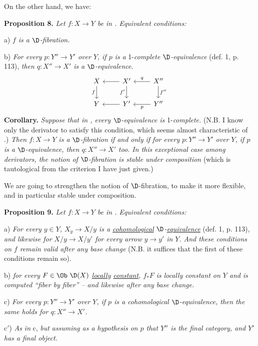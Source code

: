 On the other hand, we have:

\textbf{Proposition 8.} \textit{Let $f : X \to Y$ be in \Dia. Equivalent conditions:}

a) \textit{$f$ is a $\D$-fibration.}

b) \textit{For every $p : Y'' \to Y'$ over $Y$, if $p$ is a} 1-\textit{complete $\D$-equivalence} (def. 1, p. 113), \textit{then $q : X'' \to X'$ is a $\D$-equivalence.}
\[
\begin{tikzcd}
X \arrow[d, "f"'] & X' \arrow[l] \arrow[d, "f'"'] & X'' \arrow[l, "q"'] \arrow[d, "f''"] \\
Y & Y' \arrow[l] & Y'' \arrow[l, "p"]
\end{tikzcd}
\]
\textbf{Corollary.} \textit{Suppose that in \Dia, every $\D$-equivalence is} 1-\textit{complete.} (N.B. I know only the derivator \HOT{} to satisfy this condition, which seems almost characteristic of \HOT.) \textit{Then $f : X \to Y$ is a $\D$-fibration if and only if for every $p : Y'' \to Y'$ over $Y$, if $p$ is a $\D$-equivalence, then $q : X'' \to X'$ too. In this exceptional case among derivators, the notion of $\D$-fibration is stable under composition} (which is tautological from the criterion I have just given.)


We are going to strengthen the notion of $\D$-fibration, to make it more flexible, and in particular stable under composition.

\textbf{Proposition 9.} \textit{Let $f : X \to Y$ be in \Dia. Equivalent conditions:}

a) \textit{For every $y \in Y$, $X_y \to X/y$ is a \underline{cohomological} $\D$-\underline{equivalence}} (def. 1, p. 113), \textit{and likewise for $X/y \to X/y'$ for every arrow $y \to y'$ in $Y$. And these conditions on $f$ remain valid after any base change} (N.B. it suffices that the first of these conditions remain so).

b) \textit{for every $F \in \Ob\ \D(X)$ \underline{locally} \underline{constant}, $f_*F$ is locally constant on $Y$ and is computed ``fiber by fiber'' -- and likewise after any base change.} %

c) \textit{For every $p : Y'' \to Y'$ over $Y$, if $p$ is a cohomological $\D$-equivalence, then the same holds for $q : X'' \to X'$.}

c$'$) \textit{As in} c, \textit{but assuming as a hypothesis on $p$ that $Y''$ is the final category, and $Y'$ has a final object.}

